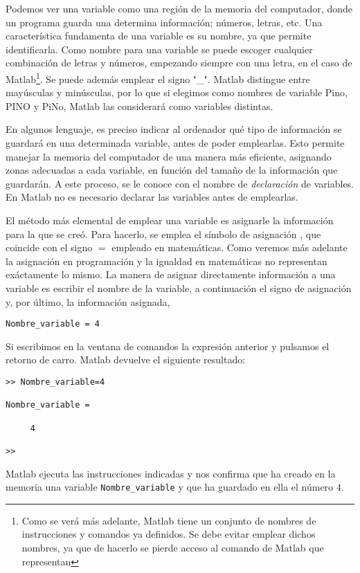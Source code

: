 Podemos ver una variable como una región de la memoria del computador, donde un programa guarda una determina información; números, letras, etc. Una característica fundamenta de una variable es su nombre, ya que permite identificarla.  Como nombre para una variable se puede escoger cualquier combinación de letras y números, empezando siempre con una letra, en el caso de Matlab\footnote{Como se verá más adelante, Matlab tiene un conjunto de nombres de instrucciones y comandos ya definidos. Se debe evitar emplear dichos nombres, ya que de hacerlo se pierde acceso al comando de Matlab que representan}. Se puede además emplear el signo "\_". Matlab distingue entre mayúsculas y minúsculas, por lo que si elegimos como nombres de variable Pino, PINO y PiNo, Matlab las considerará como variables distintas. 

 En algunos lenguaje, es preciso indicar al ordenador qué tipo de información se guardará en una determinada variable, antes de poder emplearlas. Esto permite manejar la memoria del computador de una manera más eficiente, asignando zonas adecuadas a cada variable, en función del tamaño de la información que guardarán. A este proceso, se le conoce con el nombre de \emph{declaración} de variables. En Matlab no es necesario declarar las variables antes de emplearlas.

El método más elemental de emplear una variable es asignarle la información para la que se creó. Para hacerlo, se emplea el símbolo de asignación  , que coincide con el signo $=$ empleado en matemáticas. Como veremos más adelante la asignación en programación y la igualdad en matemáticas no representan exáctamente lo mismo. La manera de asignar directamente información a una variable es escribir el nombre de la variable, a continuación  el signo de asignación y, por último, la información asignada,
\begin{verbatim}
Nombre_variable = 4
\end{verbatim}  

Si escribimos en la ventana de comandos la expresión anterior y pulsamos el retorno de carro. Matlab devuelve el siguiente resultado:

\begin{verbatim}
>> Nombre_variable=4

Nombre_variable =

     4

>> 
\end{verbatim}  
Matlab ejecuta las instrucciones indicadas y nos confirma que ha creado en la memoria una variable \texttt{Nombre\_variable} y que ha guardado en  ella el número $4$. 


